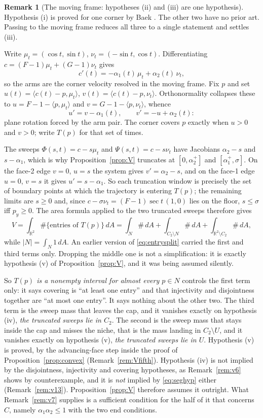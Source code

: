 \documentclass[11pt]{article}
\theoremstyle{definition}
\newtheorem{remark}[theorem]{Remark}
\newcommand{\R}{\mathbb{R}}
\begin{document}
\begin{remark}[The moving frame: hypotheses (ii) and (iii) are one hypothesis]\label{rem:v4}
Hypothesis (i) is proved for one corner by Baek \cite{Bae24}. The other two have no prior
art. Passing to the moving frame reduces all three to a single statement and settles (iii).

Write $\mu_t=(\cos t,\sin t)$, $\nu_t=(-\sin t,\cos t)$. Differentiating
$c=(F-1)\mu_t+(G-1)\nu_t$ gives
\[
  c'(t)=-\alpha_1(t)\,\mu_t+\alpha_2(t)\,\nu_t,
\]
so the arms are the corner velocity resolved in the moving frame. Fix $p$ and set
$u(t)=\langle c(t)-p,\mu_t\rangle$, $v(t)=\langle c(t)-p,\nu_t\rangle$. Orthonormality
collapses these to $u=F-1-\langle p,\mu_t\rangle$ and $v=G-1-\langle p,\nu_t\rangle$, whence
\[
  u'=v-\alpha_1(t),\qquad v'=-u+\alpha_2(t):
\]
plane rotation forced by the arm pair. The corner covers $p$ exactly when $u>0$ and $v>0$;
write $T(p)$ for that set of times.

The sweeps $\Phi(s,t)=c-s\mu_t$ and $\Psi(s,t)=c-s\nu_t$ have Jacobians $\alpha_2-s$ and
$s-\alpha_1$, which is why Proposition~\ref{prop:V} truncates at $[0,\alpha_2^+]$ and
$[\alpha_1^+,\sigma]$. On the face-2 edge $v=0$, $u=s$ the system gives $v'=\alpha_2-s$, and
on the face-1 edge $u=0$, $v=s$ it gives $u'=s-\alpha_1$. So each truncation window is
precisely the set of boundary points at which the trajectory is entering $T(p)$; the
remaining limits are $s\ge0$ and, since $c-\sigma\nu_t=(F-1)\sec t\,(1,0)$ lies on the floor,
$s\le\sigma$ iff $p_y\ge0$. The area formula applied to the two truncated sweeps therefore
gives
\begin{equation}\label{eq:entrysplit}
  V=\int_{\R^2} \#\{\text{entries of }T(p)\}\,dA
   =\int_N \#\,dA+\int_{C_2\setminus N} \#\,dA+\int_{\R^2\setminus C_2} \#\,dA ,
\end{equation}
while $|N|=\int_N 1\,dA$. An earlier version of \eqref{eq:entrysplit} carried the first and
third terms only. Dropping the middle one is not a simplification: it is exactly hypothesis
(v) of Proposition~\ref{prop:V}, and it was being assumed silently.

So \emph{$T(p)$ is a nonempty interval for almost every $p\in N$} controls the first term
only: it says covering is ``at least one entry'' and that injectivity and disjointness
together are ``at most one entry''. It says nothing about the other two. The third term is
the sweep mass that leaves the cap, and it vanishes exactly on hypothesis (iv),
\emph{the truncated sweeps lie in $C_2$}. The second is the sweep mass that stays inside the
cap and misses the niche, that is the mass landing in $C_2\setminus U$, and it vanishes
exactly on hypothesis (v), \emph{the truncated sweeps lie in $U$}. Hypothesis (v) is proved,
by the advancing-face step inside the proof of Proposition~\ref{prop:convex}
(Remark~\ref{rem:Vfifth}). Hypothesis (iv) is not implied by the disjointness, injectivity
and covering hypotheses, as Remark~\ref{rem:v6} shows by counterexample, and it is \emph{not}
implied by \eqref{eq:seghyp} either (Remark~\ref{rem:v13}). Proposition~\ref{prop:V}
therefore assumes it outright. What Remark~\ref{rem:v7} supplies is a sufficient condition
for the half of it that concerns $C$, namely $\alpha_1\alpha_2\le1$ with the two end
conditions.


\end{remark}
\end{document}

